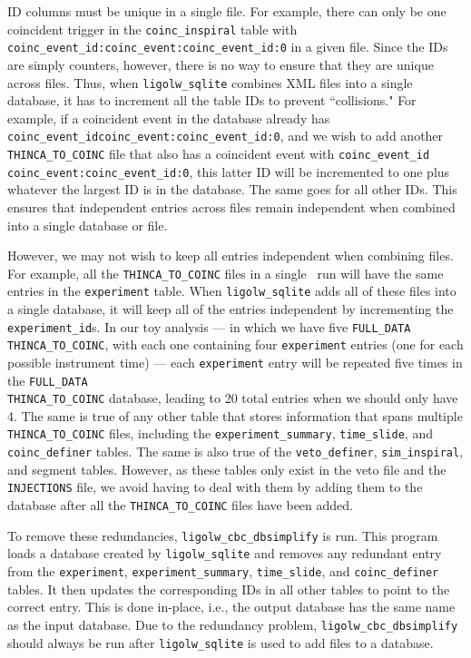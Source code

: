 ID columns must be unique in a single file. For example, there can only be one
coincident trigger in the \verb|coinc_inspiral| table with \\
\verb|coinc_event_id:coinc_event:coinc_event_id:0| in a given file. Since the IDs are simply
counters, however, there is no way to ensure that they are unique across files.
Thus, when \verb|ligolw_sqlite| combines XML files into a single database, it
has to increment all the table IDs to prevent ``collisions." For example, if a
coincident event in the database already has \verb|coinc_event_idcoinc_event:coinc_event_id:0|,
and we wish to add another \verb|THINCA_TO_COINC| file that also has a coincident
event with \verb|coinc_event_id coinc_event:coinc_event_id:0|, this latter ID will be
incremented to one plus whatever the largest ID is in the database. The same
goes for all other IDs. This ensures that independent entries across files
remain independent when combined into a single database or file.

However, we may not wish to keep all entries independent when combining files.
For example, all the \verb|THINCA_TO_COINC| files in a single \ihope~run will
have the same entries in the \verb|experiment| table. When \verb|ligolw_sqlite|
adds all of these files into a single database, it will keep all of the entries
independent by incrementing the \verb|experiment_id|s. In our toy analysis ---
in which we have five \verb|FULL_DATA| \\ \verb|THINCA_TO_COINC|, with each one
containing four \verb|experiment| entries (one for each possible instrument
time) --- each \verb|experiment| entry will be repeated five times in the
\verb|FULL_DATA| \\ \verb|THINCA_TO_COINC| database, leading to 20 total entries when we
should only have 4. The same is true of any other table that stores information
that spans multiple \verb|THINCA_TO_COINC| files, including the
\verb|experiment_summary|, \verb|time_slide|, and \verb|coinc_definer| tables.
The same is also true of the \verb|veto_definer|, \verb|sim_inspiral|, and
segment tables. However, as these tables only exist in the veto file and the
\verb|INJECTIONS| file, we avoid having to deal with them by adding them to the
database after all the \verb|THINCA_TO_COINC| files have been added.

To remove these redundancies, \verb|ligolw_cbc_dbsimplify| is run. This program
loads a database created by \verb|ligolw_sqlite| and removes any redundant
entry from the \verb|experiment|, \verb|experiment_summary|, \verb|time_slide|,
and \verb|coinc_definer| tables. It then updates the corresponding IDs in all
other tables to point to the correct entry. This is done in-place, i.e., the
output database has the same name as the input database. Due to the redundancy
problem, \verb|ligolw_cbc_dbsimplify| should always be run after
\verb|ligolw_sqlite| is used to add files to a database.

